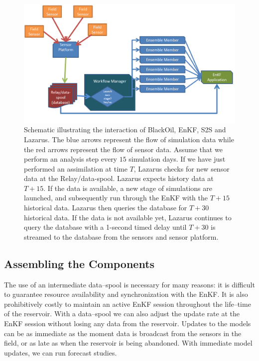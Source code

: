 \documentclass{acm_proc_article-sp}
\begin{document}
\begin{figure}
\begin{center}
 \includegraphics*[scale=0.4,angle=0]{figures/DetailedSensorFlow.png}
\end{center}
\caption{Schematic illustrating the interaction of BlackOil, EnKF, S2S
  and Lazarus. The blue arrows represent the flow of simulation data
  while the red arrows represent the flow of sensor data. Assume that
  we perform an analysis step every $15$ simulation days. If we have
  just performed an assimilation at time $T$, Lazarus checks for new
  sensor data at the Relay/data-spool. Lazarus expects history data at
  $T+15$. If the data is available, a new stage of simulations are
  launched, and subsequently run through the EnKF with the $T+15$
  historical data. Lazarus then queries the database for $T+30$
  historical data. If the data is not available yet, Lazarus continues
  to query the database with a 1-second timed delay until $T+30$ is
  streamed to the database from the sensors and sensor platform. }
\label{fig:SensorRelay}
\end{figure}

\subsection{Assembling the Components } The use of an intermediate
data--spool is necessary for many reasons: it is difficult to
guarantee resource availability and synchronization with the EnKF. It
is also prohibitively costly to maintain an active EnKF session
throughout the life--time of the reservoir. With a data--spool we can
also adjust the update rate at the EnKF session without losing any
data from the reservoir. Updates to the models can be as immediate as
the moment data is broadcast from the sensors in the field, or as late
as when the reservoir is being abandoned. With immediate model
updates, we can run forecast studies.
\end{document}
